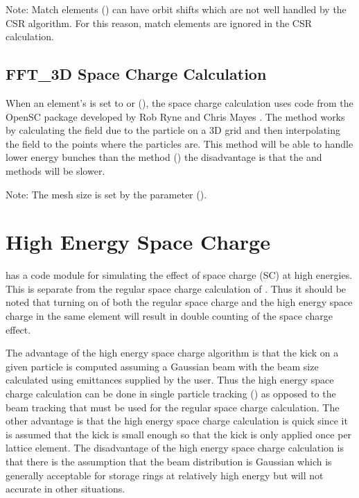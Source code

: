 Note: Match elements () can have orbit shifts which are not well handled by the CSR
algorithm. For this reason, match elements are ignored in the CSR calculation.

\subsection{FFT_3D Space Charge Calculation}
\label{s:sc.fft}

When an element's  is set to  or 
(), the space charge calculation uses code from the OpenSC package developed by
Rob Ryne and Chris Mayes \cite{b:opensc}. The method works by calculating the field due to the
particle on a 3D grid and then interpolating the field to the points where the particles are. This
method will be able to handle lower energy bunches than the  method ()
the disadvantage is that the  and  methods will be slower.

Note: The mesh size is set by the  parameter 
().

\section{High Energy Space Charge}
\label{s:he.space.charge}

\bmad has a code module for simulating the effect of space charge (SC) at high energies. This is
separate from the regular space charge calculation of . Thus it should be noted that
turning on of both the regular space charge and the high energy space charge in the same element
will result in double counting of the space charge effect.

The advantage of the high energy space charge algorithm is that the kick on a given particle is
computed assuming a Gaussian beam with the beam size calculated using emittances supplied by the
user. Thus the high energy space charge calculation can be done in single particle tracking
() as opposed to the beam tracking that must be used for the regular space charge
calculation. The other advantage is that the high energy space charge calculation is quick since it
is assumed that the kick is small enough so that the kick is only applied once per lattice
element. The disadvantage of the high energy space charge calculation is that there is the
assumption that the beam distribution is Gaussian which is generally acceptable for storage rings at
relatively high energy but will not accurate in other situations.

